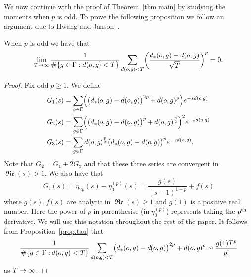 \documentclass[10pt]{amsart}
\theoremstyle{definition}\newtheorem{defi}[theo]{Definition}\newtheorem{rema}[theo]{Remark}\newtheorem{exam}[theo]{Example}\newtheorem{exem}[theo]{Example}\newtheorem{nota}[theo]{Notation}
\newcommand{\G}{\Gamma}
\DeclareMathOperator{\fkRe}{\mathfrak{Re}}
\let\originalleft\left
\let\originalright\right
\renewcommand{\left}{\mathopen{}\mathclose\bgroup\originalleft}
\renewcommand{\right}{\aftergroup\egroup\originalright}
\renewcommand*{\to}{\mathchoice{\longrightarrow}{\rightarrow}{\rightarrow}{\rightarrow}}
\theoremstyle{plain}
\begin{document}
We now continue with the proof of Theorem~\ref{thm.main} by studying the moments when $p$ is odd. To prove the following proposition we follow an argument due to Hwang and Janson~\cite{hwang.janson}.
\begin{prop}
When $p$ is odd we have that
\[
\lim_{T\to\infty} \frac{1}{\#\left\{ g\in\G: d(o,g) < T\right\}} \sum_{d(o,g) < T} \left(\frac{d_\ast(o,g) - d(o,g)}{\sqrt{T}} \right)^p = 0.
\]
\end{prop}

\begin{proof}
Fix odd $p \ge 1$. We define
\begin{align*}
&G_1(s) = \sum_{g\in\G} \left(\bigl(d_\ast(o,g) - d(o,g)\bigr)^{2p} + d(o,g)^p\right) e^{-sd(o,g)}\\
&G_2(s) = \sum_{g\in\G} \left(\bigl(d_\ast(o,g) - d(o,g)\bigr)^p + d(o,g)^{\frac{p}{2}} \right)^2 e^{-sd(o,g)}\\
&G_3(s) = \sum_{g\in\G} d(o,g)^{\frac{p}{2}} \bigl(d_\ast(o,g) - d(o,g)\bigr)^p e^{-sd(o,g)}.
\end{align*}
Note that $G_2 = G_1 + 2G_3$ and that these three series are convergent in $\fkRe(s) > 1$. We also have that
\[
G_1(s) = \eta_{2p}(s) - \eta_0^{(p)}(s) = \frac{g(s)}{(s-1)^{1+p}} + f(s)
\]
where $g(s), f(s)$ are analytic in $\fkRe(s) \ge 1$ and $g(1)$ is a positive real number. Here the power of $p$ in parenthesise (in $\eta_0^{(p)}$) represents taking the $p^{\rm th}$ derivative. We will use this notation throughout the rest of the paper. It follows from Proposition~\ref{prop.tau} that
\[
\frac{1}{\#\left\{g\in\G: d(o,g) <T\right\}} \sum_{d(o,g) <T} \bigl(d_\ast(o,g) - d(o,g)\bigr)^{2p} + d(o,g)^p \sim \frac{g(1)T^p}{p!}
\]
as $T\to\infty$.


\end{proof}
\end{document}
